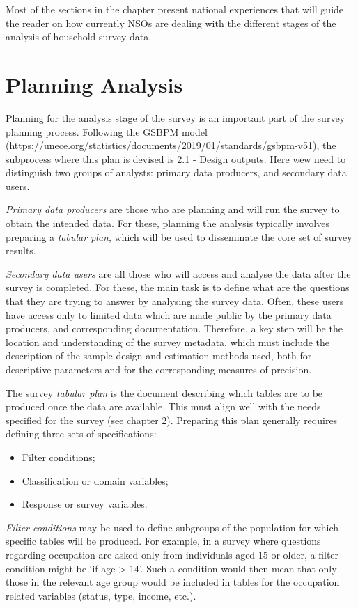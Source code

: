\documentclass[
  12pt,
]{book}
\begin{document}
Most of the sections in the chapter present national experiences that will guide the reader on how currently NSOs are dealing with the different stages of the analysis of household survey data.

\section{Planning Analysis}\label{planning-analysis}

Planning for the analysis stage of the survey is an important part of the survey planning process. Following the GSBPM model (\url{https://unece.org/statistics/documents/2019/01/standards/gsbpm-v51}), the subprocess where this plan is devised is 2.1 - Design outputs. Here wew need to distinguish two groups of analysts: primary data producers, and secondary data users.

\emph{Primary data producers} are those who are planning and will run the survey to obtain the intended data. For these, planning the analysis typically involves preparing a \emph{tabular plan}, which will be used to disseminate the core set of survey results.

\emph{Secondary data users} are all those who will access and analyse the data after the survey is completed. For these, the main task is to define what are the questions that they are trying to answer by analysing the survey data. Often, these users have access only to limited data which are made public by the primary data producers, and corresponding documentation. Therefore, a key step will be the location and understanding of the survey metadata, which must include the description of the sample design and estimation methods used, both for descriptive parameters and for the corresponding measures of precision.

The survey \emph{tabular plan} is the document describing which tables are to be produced once the data are available. This must align well with the needs specified for the survey (see chapter 2). Preparing this plan generally requires defining three sets of specifications:

\begin{itemize}
\item
  Filter conditions;
\item
  Classification or domain variables;
\item
  Response or survey variables.
\end{itemize}

\emph{Filter conditions} may be used to define subgroups of the population for which specific tables will be produced. For example, in a survey where questions regarding occupation are asked only from individuals aged 15 or older, a filter condition might be `if age \textgreater{} 14'. Such a condition would then mean that only those in the relevant age group would be included in tables for the occupation related variables (status, type, income, etc.).
\end{document}
